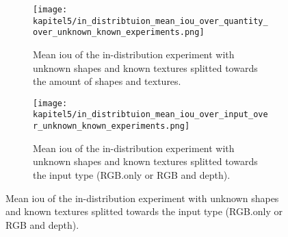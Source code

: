 			\FloatBarrier
			\begin{figure}[h]
				\centering
				\caption{In-Distribution Experiment with unknown shapes and known textures for quantity and input-type.}
				\begin{subfigure}{0.4\textwidth}
					\centering
					\texttt{[image: kapitel5/in\_distribtuion\_mean\_iou\_over\_quantity\_over\_unknown\_known\_experiments.png]}
					\caption[Mean \ac{iou} of the in-distribution experiment with unknown shapes and known textures splitted towards the amount of shapes and textures.]{Mean \ac{iou} of the in-distribution experiment with unknown shapes and known textures splitted towards the amount of shapes and textures. }
					\label{img:id-uk-result-quantity}
				\end{subfigure}
				\begin{subfigure}{0.4\textwidth}
					\centering
					\texttt{[image: kapitel5/in\_distribtuion\_mean\_iou\_over\_input\_over\_unknown\_known\_experiments.png]}
					\caption[Mean \ac{iou} of the in-distribution experiment with unknown shapes and known textures splitted towards the input type (RGB.only or RGB and depth).]{Mean \ac{iou} of the in-distribution experiment with unknown shapes and known textures splitted towards the input type (RGB.only or RGB and depth).}
					\label{img:id-uk-result-input}
				\end{subfigure}
			\end{figure}
		
